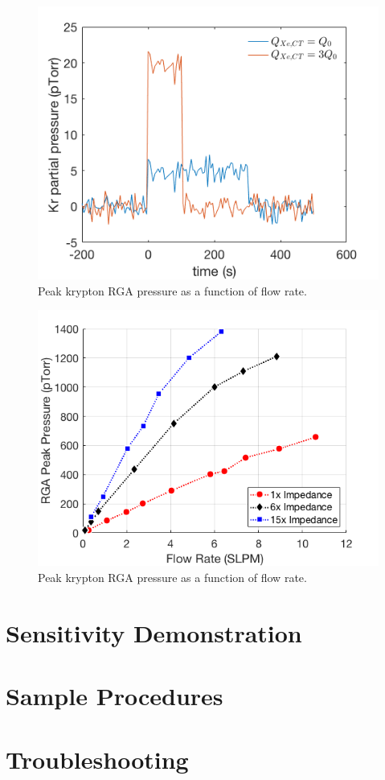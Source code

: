 \documentclass[12pt]{article}
\begin{document}
\begin{figure}[h]
  \includegraphics[width=\linewidth]{Figures/RGAtrace_ideal.png}
  \caption{Peak krypton RGA pressure as a function of flow rate.  }
  \label{fig:flowresponse1x}
\end{figure}
\begin{figure}[h]
  \includegraphics[width=\linewidth]{Figures/FlowResponse.png}
  \caption{Peak krypton RGA pressure as a function of flow rate.  }
  \label{fig:RGAtrace_ideal}
\end{figure}



\section{Sensitivity Demonstration}




\appendix
\section{Sample Procedures}
\label{ap:procedures}
\section{Troubleshooting}



{}

\end{document}

